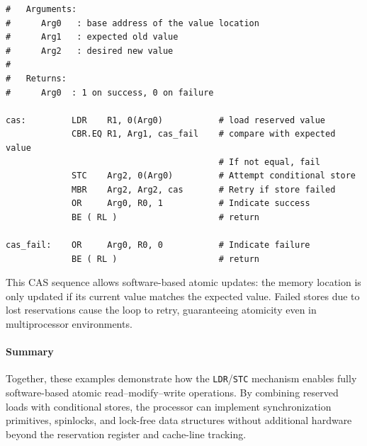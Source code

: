 \begin{lstlisting}[style=iPageOpStyle]
#   Arguments:
#      Arg0   : base address of the value location
#      Arg1   : expected old value
#      Arg2   : desired new value
#
#   Returns:
#      Arg0  : 1 on success, 0 on failure

cas:         LDR    R1, 0(Arg0)           # load reserved value
             CBR.EQ R1, Arg1, cas_fail    # compare with expected value
                                          # If not equal, fail
             STC    Arg2, 0(Arg0)         # Attempt conditional store
             MBR    Arg2, Arg2, cas       # Retry if store failed
             OR     Arg0, R0, 1           # Indicate success
             BE ( RL )	                  # return

cas_fail:    OR     Arg0, R0, 0           # Indicate failure
             BE ( RL )	                  # return
\end{lstlisting}

This CAS sequence allows software-based atomic updates: the memory location is only updated if its current value matches the expected value.  Failed stores due to lost reservations cause the loop to retry, guaranteeing atomicity even in multiprocessor environments.

\paragraph{Summary}

Together, these examples demonstrate how the \texttt{LDR}/\texttt{STC} mechanism enables fully software-based atomic read–modify–write operations. By combining reserved loads with conditional stores, the processor can implement synchronization primitives, spinlocks, and lock-free data structures without additional hardware beyond the reservation register and cache-line tracking.


